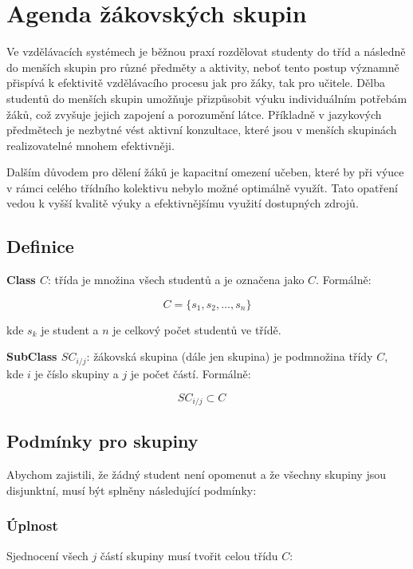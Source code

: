 \chapter{Agenda žákovských skupin}

Ve vzdělávacích systémech je běžnou praxí rozdělovat studenty do tříd a následně do menších skupin pro různé předměty a aktivity, neboť tento postup významně přispívá k efektivitě vzdělávacího procesu jak pro žáky, tak pro učitele. Dělba studentů do menších skupin umožňuje přizpůsobit výuku individuálním potřebám žáků, což zvyšuje jejich zapojení a porozumění látce. Příkladně v jazykových předmětech je nezbytné vést aktivní konzultace, které jsou v menších skupinách realizovatelné mnohem efektivněji. 

Dalším důvodem pro dělení žáků je kapacitní omezení učeben, které by při výuce v rámci celého třídního kolektivu nebylo možné optimálně využít. Tato opatření vedou k vyšší kvalitě výuky a efektivnějšímu využití dostupných zdrojů.

\section{Definice}

\textbf{Class \( C \)}: třída je množina všech studentů a je označena jako \( C \). Formálně:

\[
C = \{ s_1, s_2, \ldots, s_n \}
\]

kde \( s_k \) je student a \( n \) je celkový počet studentů ve třídě.

\textbf{SubClass \( SC_{i/j} \)}: žákovská skupina (dále jen skupina) je podmnožina třídy \( C \), kde \( i \) je číslo skupiny a \( j \) je počet částí. Formálně:

\[
SC_{i/j} \subset C \quad
\]

\section{Podmínky pro skupiny}

Abychom zajistili, že žádný student není opomenut a že všechny skupiny jsou disjunktní, musí být splněny následující podmínky:

\subsection*{Úplnost}

Sjednocení všech \( j \) částí skupiny musí tvořit celou třídu \( C \):

